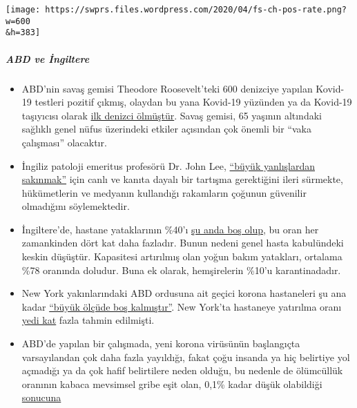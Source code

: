 \texttt{[image: https://swprs.files.wordpress.com/2020/04/fs-ch-pos-rate.png?w=600\\\&h=383]}

\hypertarget{abd-ve-ingiltere}{%
\subparagraph{\texorpdfstring{\textbf{ABD ve
İngiltere}}{ABD ve İngiltere}}\label{abd-ve-ingiltere}}

\begin{itemize}
\tightlist
\item
  ABD'nin savaş gemisi Theodore Roosevelt'teki 600 denizciye yapılan
  Kovid-19 testleri pozitif çıkmış, olaydan bu yana Kovid-19 yüzünden ya
  da Kovid-19 taşıyıcısı olarak
  \href{https://www.theguardian.com/world/2020/apr/14/sailor-dies-from-covid-19-and-600-test-positive-after-outbreak-on-uss-theodore-roosevelt-guam}{ilk
  denizci ölmüştür}. Savaş gemisi, 65 yaşının altındaki sağlıklı genel
  nüfus üzerindeki etkiler açısından çok önemli bir ``vaka çalışması''
  olacaktır.
\item
  İngiliz patoloji emeritus profesörü Dr. John Lee,
  \href{https://www.spectator.co.uk/article/to-understand-covid-we-need-evidence-scepticism-and-vigorous-debate}{``büyük
  yanlışlardan sakınmak''} için canlı ve kanıta dayalı bir tartışma
  gerektiğini ileri sürmekte, hükümetlerin ve medyanın kullandığı
  rakamların çoğunun güvenilir olmadığını söylemektedir.
\item
  İngiltere'de, hastane yataklarının \%40'ı
  \href{https://www.hsj.co.uk/acute-care/nhs-hospitals-have-four-times-more-empty-beds-than-normal/7027392.article}{şu
  anda boş olup}, bu oran her zamankinden dört kat daha fazladır. Bunun
  nedeni genel hasta kabulündeki keskin düşüştür. Kapasitesi artırılmış
  olan yoğun bakım yatakları, ortalama \%78 oranında doludur. Buna ek
  olarak, hemşirelerin \%10'u karantinadadır.
\item
  New York yakınlarındaki ABD ordusuna ait geçici korona hastaneleri şu
  ana kadar
  \href{https://nypost.com/2020/04/09/usns-comfort-and-javits-center-mostly-empty-amid-coronavirus/}{``büyük
  ölçüde boş kalmıştır''}. New York'ta hastaneye yatırılma oranı
  \href{https://www.nytimes.com/2020/04/10/nyregion/new-york-coronavirus-hospitals.html}{yedi
  kat} fazla tahmin edilmişti.
\item
  ABD'de yapılan bir çalışmada, yeni korona virüsünün başlangıçta
  varsayılandan çok daha fazla yayıldığı, fakat çoğu insanda ya hiç
  belirtiye yol açmadığı ya da çok hafif belirtilere neden olduğu, bu
  nedenle de ölümcüllük oranının kabaca mevsimsel gribe eşit olan, 0,1\%
  kadar düşük olabildiği
  \href{https://www.medrxiv.org/content/10.1101/2020.04.01.20050542v1}{sonucuna
}
\end{itemize}
